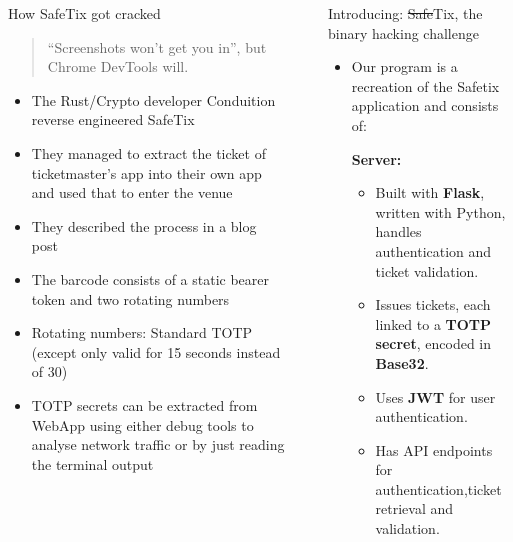 \documentclass[final,dvipsnames]{beamer}
\newlength{\sepwidth}
\newlength{\colwidth}
\newcommand{\separatorcolumn}{\begin{column}{\sepwidth}\end{column}}
\begin{document}
\begin{frame}[t, fragile]
\begin{columns}[t]
\begin{column}{\colwidth}
    \begin{block}{How SafeTix got cracked}
        \begin{quotation}
            “Screenshots won’t get you in”, but Chrome DevTools will.
        \end{quotation}
        \begin{itemize}
            \item The Rust/Crypto developer Conduition reverse engineered SafeTix
            \item They managed to extract the ticket of ticketmaster's app into their own app and used that to enter the venue
            \item They described the process in a blog post \cite{reverse_engineering_ticketmaster}
            \item The barcode consists of a static bearer token and two rotating numbers \cite{reverse_engineering_ticketmaster}
            \item Rotating numbers: Standard TOTP (except only valid for 15 seconds instead of 30)
            \item TOTP secrets can be extracted from WebApp using either debug tools to analyse network traffic or by just reading the terminal output
        \end{itemize}
    \end{block}
\end{column}

\separatorcolumn

\begin{column}{\colwidth}

    \begin{block}{Introducing: \sout{Safe}Tix, the binary hacking challenge}

		\begin{itemize}
			\item Our program is a recreation of the Safetix application and consists of:
            
            \textbf{Server:}
            \begin{itemize}
                \item Built with \textbf{Flask}, written with Python, handles authentication and ticket validation.
                \item Issues tickets, each linked to a \textbf{TOTP secret}, encoded in \textbf{Base32}.
                \item Uses \textbf{JWT} for user authentication.
                \item Has API endpoints for authentication,ticket retrieval and validation.
            \end{itemize}
        

\end{itemize}
\end{block}
\end{column}
\end{columns}
\end{frame}
\end{document}
